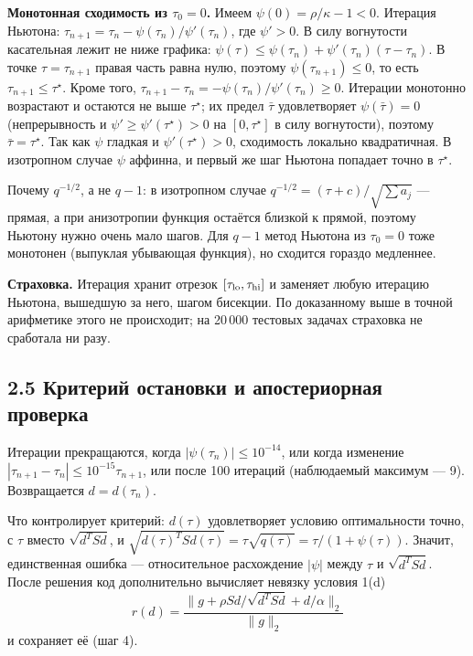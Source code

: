 \documentclass[11pt,a4paper]{article}
\newcommand{\norm}[1]{\lVert #1\rVert_2}
\begin{document}
\textbf{Монотонная сходимость из $\tau_0=0$.} Имеем $\psi(0)=\rho/\kappa-1<0$.
Итерация Ньютона: $\tau_{n+1}=\tau_n-\psi(\tau_n)/\psi'(\tau_n)$, где $\psi'>0$. В силу
вогнутости касательная лежит не ниже графика:
$\psi(\tau)\le\psi(\tau_n)+\psi'(\tau_n)(\tau-\tau_n)$. В точке $\tau=\tau_{n+1}$
правая часть равна нулю, поэтому $\psi(\tau_{n+1})\le0$, то есть
$\tau_{n+1}\le\tau^\star$. Кроме того,
$\tau_{n+1}-\tau_n=-\psi(\tau_n)/\psi'(\tau_n)\ge0$. Итерации монотонно возрастают и
остаются не выше $\tau^\star$; их предел $\bar\tau$ удовлетворяет $\psi(\bar\tau)=0$
(непрерывность и $\psi'\ge\psi'(\tau^\star)>0$ на $[0,\tau^\star]$ в силу вогнутости),
поэтому $\bar\tau=\tau^\star$. Так как $\psi$ гладкая и $\psi'(\tau^\star)>0$,
сходимость локально квадратичная. В изотропном случае $\psi$ аффинна, и первый же шаг
Ньютона попадает точно в $\tau^\star$.

Почему $q^{-1/2}$, а не $q-1$: в изотропном случае $q^{-1/2}=(\tau+c)/\sqrt{\sum a_j}$ —
прямая, а при анизотропии функция остаётся близкой к прямой, поэтому Ньютону нужно
очень мало шагов. Для $q-1$ метод Ньютона из $\tau_0=0$ тоже монотонен (выпуклая
убывающая функция), но сходится гораздо медленнее.

\textbf{Страховка.} Итерация хранит отрезок $[\tau_{\rm lo},\tau_{\rm hi}]$ и заменяет
любую итерацию Ньютона, вышедшую за него, шагом бисекции. По доказанному выше в точной
арифметике этого не происходит; на 20\,000 тестовых задачах страховка не сработала ни
разу.

\subsection*{2.5 Критерий остановки и апостериорная проверка}

Итерации прекращаются, когда $|\psi(\tau_n)|\le10^{-14}$, или когда изменение
$|\tau_{n+1}-\tau_n|\le10^{-15}\tau_{n+1}$, или после 100 итераций (наблюдаемый
максимум — 9). Возвращается $d=d(\tau_n)$.

Что контролирует критерий: $d(\tau)$ удовлетворяет условию оптимальности точно, с
$\tau$ вместо $\sqrt{d^TSd}$, и
$\sqrt{d(\tau)^TSd(\tau)}=\tau\sqrt{q(\tau)}=\tau/(1+\psi(\tau))$. Значит, единственная
ошибка — относительное расхождение $|\psi|$ между $\tau$ и $\sqrt{d^TSd}$. После решения
код дополнительно вычисляет невязку условия 1(d)
\begin{equation*}
r(d)=\frac{\norm{g+\rho Sd/\sqrt{d^TSd}+d/\alpha}}{\norm g}
\end{equation*}
и сохраняет её (шаг 4).
\end{document}
